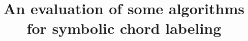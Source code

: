 \documentclass[english]{article}
\begin{document}
\graphicspath{{figs/}{data/}}

\title{An evaluation of some algorithms for symbolic chord labeling}

\author{}{}{}{}


\begin{abstract}

\end{abstract}






\end{document}
